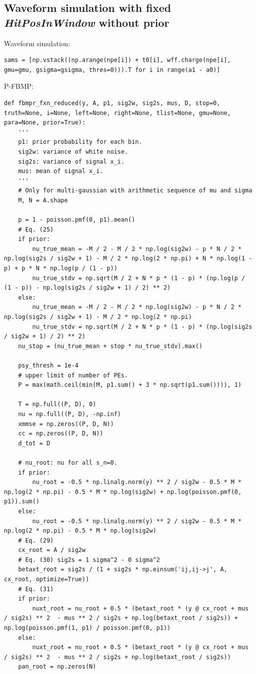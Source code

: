 \documentclass[notitlepage]{article}
\begin{document}
\subsection{Waveform simulation with fixed \textit{HitPosInWindow} \textbf{without} prior}

Waveform simulation:

\begin{lstlisting}
sams = [np.vstack((np.arange(npe[i]) + t0[i], wff.charge(npe[i], gmu=gmu, gsigma=gsigma, thres=0))).T for i in range(a1 - a0)]
\end{lstlisting}

P-FBMP:

\begin{lstlisting}
def fbmpr_fxn_reduced(y, A, p1, sig2w, sig2s, mus, D, stop=0, truth=None, i=None, left=None, right=None, tlist=None, gmu=None, para=None, prior=True):
    '''
    p1: prior probability for each bin.
    sig2w: variance of white noise.
    sig2s: variance of signal x_i.
    mus: mean of signal x_i.
    '''
    # Only for multi-gaussian with arithmetic sequence of mu and sigma
    M, N = A.shape

    p = 1 - poisson.pmf(0, p1).mean()
    # Eq. (25)
    if prior:
        nu_true_mean = -M / 2 - M / 2 * np.log(sig2w) - p * N / 2 * np.log(sig2s / sig2w + 1) - M / 2 * np.log(2 * np.pi) + N * np.log(1 - p) + p * N * np.log(p / (1 - p))
        nu_true_stdv = np.sqrt(M / 2 + N * p * (1 - p) * (np.log(p / (1 - p)) - np.log(sig2s / sig2w + 1) / 2) ** 2)
    else:
        nu_true_mean = -M / 2 - M / 2 * np.log(sig2w) - p * N / 2 * np.log(sig2s / sig2w + 1) - M / 2 * np.log(2 * np.pi)
        nu_true_stdv = np.sqrt(M / 2 + N * p * (1 - p) * (np.log(sig2s / sig2w + 1) / 2) ** 2)
    nu_stop = (nu_true_mean + stop * nu_true_stdv).max()

    psy_thresh = 1e-4
    # upper limit of number of PEs.
    P = max(math.ceil(min(M, p1.sum() + 3 * np.sqrt(p1.sum()))), 1)

    T = np.full((P, D), 0)
    nu = np.full((P, D), -np.inf)
    xmmse = np.zeros((P, D, N))
    cc = np.zeros((P, D, N))
    d_tot = D

    # nu_root: nu for all s_n=0.
    if prior:
        nu_root = -0.5 * np.linalg.norm(y) ** 2 / sig2w - 0.5 * M * np.log(2 * np.pi) - 0.5 * M * np.log(sig2w) + np.log(poisson.pmf(0, p1)).sum()
    else:
        nu_root = -0.5 * np.linalg.norm(y) ** 2 / sig2w - 0.5 * M * np.log(2 * np.pi) - 0.5 * M * np.log(sig2w)
    # Eq. (29)
    cx_root = A / sig2w
    # Eq. (30) sig2s = 1 sigma^2 - 0 sigma^2
    betaxt_root = sig2s / (1 + sig2s * np.einsum('ij,ij->j', A, cx_root, optimize=True))
    # Eq. (31)
    if prior:
        nuxt_root = nu_root + 0.5 * (betaxt_root * (y @ cx_root + mus / sig2s) ** 2  - mus ** 2 / sig2s + np.log(betaxt_root / sig2s)) + np.log(poisson.pmf(1, p1) / poisson.pmf(0, p1))
    else:
        nuxt_root = nu_root + 0.5 * (betaxt_root * (y @ cx_root + mus / sig2s) ** 2  - mus ** 2 / sig2s + np.log(betaxt_root / sig2s))
    pan_root = np.zeros(N)


\end{lstlisting}
\end{document}
